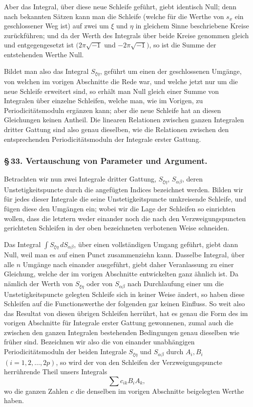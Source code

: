 \documentclass[10pt]{article}
\begin{document}
Aber das Integral, über diese neue Schleife geführt, giebt identisch Null; denn nach bekannten Sätzen kann man die Schleife (welche für die Werthe von \(s_x\) ein geschlossener Weg ist) auf zwei um \(\xi\) und \(\eta\) in gleichem Sinne beschriebene Kreise zurückführen; und da der Werth des Integrals über beide Kreise genommen gleich und entgegengesetzt ist \((2\pi\sqrt{-1}\) und \(-2\pi\sqrt{-1})\), so ist die Summe der entstehenden Werthe Null.

Bildet man also das Integral \(S_{\xi\eta}\), geführt um einen der geschlossenen Umgänge, von welchen im vorigen Abschnitte die Rede war, und welche jetzt nur um die neue Schleife erweitert sind, so erhält man Null gleich einer Summe von Integralen über einzelne Schleifen, welche man, wie im Vorigen, zu Periodicitätsmoduln ergänzen kann; aber die neue Schleife hat an diesen Gleichungen keinen Antheil. Die linearen Relationen zwischen ganzen Integralen dritter Gattung sind also genau dieselben, wie die Relationen zwischen den entsprechenden Periodicitätsmoduln der Integrale erster Gattung.

\subsubsection*{\S\,33. Vertauschung von Parameter und Argument.}

Betrachten wir nun zwei Integrale dritter Gattung, \(S_{\xi\eta}\), \(S_{\alpha\beta}\), deren Unstetigkeitspuncte durch die angefügten Indices bezeichnet werden. Bilden wir für jedes dieser Integrale die seine Unstetigkeitspuncte umkreisende Schleife, und fügen diese den Umgängen ein; wobei wir die Lage der Schleifen so einrichten wollen, dass die letztern weder einander noch die nach den Verzweigungspuncten gerichteten Schleifen in der oben bezeichneten verbotenen Weise schneiden.

Das Integral \(\int S_{\xi\eta}\,dS_{\alpha\beta}\), über einen vollständigen Umgang geführt, giebt dann Null, weil man es auf einen Punct zusammenziehn kann. Dasselbe Integral, über alle \(n\) Umgänge nach einander ausgeführt, giebt daher Veranlassung zu einer Gleichung, welche der im vorigen Abschnitte entwickelten ganz ähnlich ist. Da nämlich der Werth von \(S_{\xi\eta}\) oder von \(S_{\alpha\beta}\) nach Durchlaufung einer um die Unstetigkeitspuncte gelegten Schleife sich in keiner Weise ändert, so haben diese Schleifen auf die Functionswerthe der folgenden gar keinen Einfluss. So weit also das Resultat von diesen übrigen Schleifen herrührt, hat es genau die Form des im vorigen Abschnitte für Integrale erster Gattung gewonnenen, zumal auch die zwischen den ganzen Integralen bestehenden Bedingungen genau dieselben wie früher sind. Bezeichnen wir also die von einander unabhängigen Periodicitätsmoduln der beiden Integrale \(S_{\xi\eta}\) und \(S_{\alpha\beta}\) durch \(A_i,B_i\) \((i=1,2,\ldots,2p)\), so wird der von den Schleifen der Verzweigungspuncte herrührende Theil unsers Integrals
\[
\sum c_{ik}B_iA_k,
\]
wo die ganzen Zahlen \(c\) die denselben im vorigen Abschnitte beigelegten Werthe haben.
\end{document}
